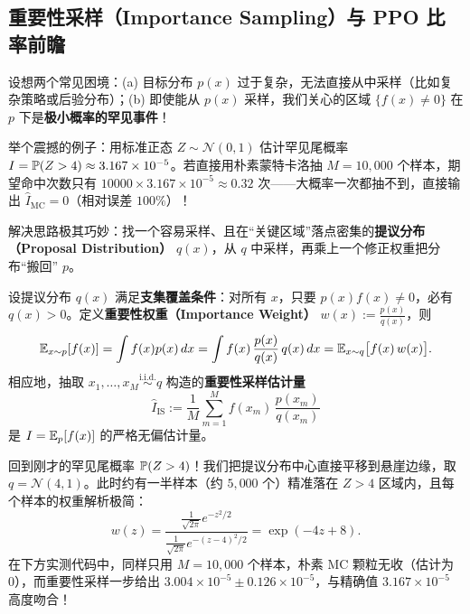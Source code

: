 \subsection{重要性采样（Importance Sampling）与 PPO 比率前瞻}

设想两个常见困境：(a) 目标分布 $p(x)$ 过于复杂，无法直接从中采样（比如复杂策略或后验分布）；(b) 即使能从 $p(x)$ 采样，我们关心的区域 $\{f(x) \neq 0\}$ 在 $p$ 下是\textbf{极小概率的罕见事件}！

举个震撼的例子：用标准正态 $Z \sim \mathcal{N}(0, 1)$ 估计罕见尾概率 $I = \mathbb{P}(Z > 4) \approx 3.167 \times 10^{-5}$。若直接用朴素蒙特卡洛抽 $M = 10{,}000$ 个样本，期望命中次数只有 $10000 \times 3.167\times 10^{-5} \approx 0.32$ 次——大概率一次都抽不到，直接输出 $\hat{I}_{\mathrm{MC}} = 0$（相对误差 $100\%$）！

解决思路极其巧妙：找一个容易采样、且在“关键区域”落点密集的\textbf{提议分布（Proposal Distribution）} $q(x)$，从 $q$ 中采样，再乘上一个修正权重把分布“搬回” $p$。

\begin{thmBox}
\begin{proposition}[重要性采样无偏恒等式]
\label{prop:ch3-is}
设提议分布 $q(x)$ 满足\textbf{支集覆盖条件}：对所有 $x$，只要 $p(x)f(x) \neq 0$，必有 $q(x) > 0$。定义\textbf{重要性权重（Importance Weight）} $w(x) := \frac{p(x)}{q(x)}$，则
\begin{equation}
  \mathbb{E}_{x \sim p}[f(x)]
  = \int f(x) p(x)\,dx
  = \int f(x)\,\frac{p(x)}{q(x)}\,q(x)\,dx
  = \mathbb{E}_{x \sim q}\bigl[f(x)\, w(x)\bigr]. \label{eq:ch3-is}
\end{equation}
相应地，抽取 $x_1, \dots, x_M \stackrel{\text{i.i.d.}}{\sim} q$ 构造的\textbf{重要性采样估计量}
\[
  \hat{I}_{\mathrm{IS}} := \frac{1}{M}\sum_{m=1}^M f(x_m)\,\frac{p(x_m)}{q(x_m)}
\]
是 $I = \mathbb{E}_p[f(x)]$ 的严格无偏估计量。
\end{proposition}
\end{thmBox}

回到刚才的罕见尾概率 $\mathbb{P}(Z > 4)$！我们把提议分布中心直接平移到悬崖边缘，取 $q = \mathcal{N}(4, 1)$。此时约有一半样本（约 $5{,}000$ 个）精准落在 $Z > 4$ 区域内，且每个样本的权重解析极简：
\[
  w(z) = \frac{\frac{1}{\sqrt{2\pi}}e^{-z^2/2}}{\frac{1}{\sqrt{2\pi}}e^{-(z-4)^2/2}} = \exp(-4z + 8).
\]
在下方实测代码中，同样只用 $M = 10{,}000$ 个样本，朴素 MC 颗粒无收（估计为 $0$），而重要性采样一步给出 $3.004 \times 10^{-5} \pm 0.126 \times 10^{-5}$，与精确值 $3.167 \times 10^{-5}$ 高度吻合！

